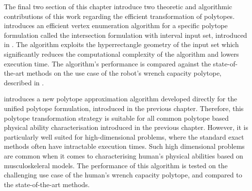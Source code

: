 The final two section of this chapter introduce two theoretic and algorithmic contributions of this work regarding the efficient transformation of polytopes.  introduces an efficient vertex enumeration algorithm for a specific polytope formulation called the intersection formulation with interval input set, introduced in . The algorithm exploits the hyperrectangle geometry of the input set which significantly reduces the computational complexity of the algorithm and lowers execution time. The algorithm's performance is compared against the state-of-the-art methods on the use case of the robot's wrench capacity polytope, described in . 

 introduces a new polytope approximation algorithm developed directly for the unified polytope formulation, introduced in the previous chapter. Therefore, this polytope transformation strategy is suitable for all common polytope based physical ability characterisation introduced in the previous chapter. However, it is particularly well suited for high-dimensional problems, where the standard exact methods often have intractable execution times. Such high dimensional problems are common when it comes to characterising human's physical abilities based on musculoskeleral models. The performance of this algorithm is tested on the challenging use case of the human's wrench capacity polytope, and compared to the state-of-the-art methods. 



